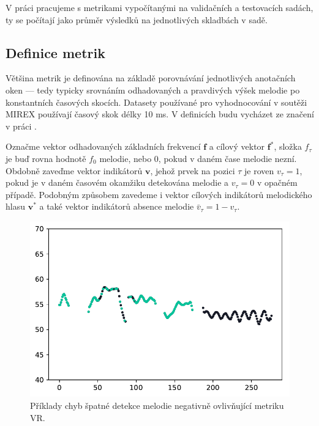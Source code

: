 V práci pracujeme s metrikami vypočítanými na validačních a testovacích sadách, ty se počítají jako průměr výsledků na jednotlivých skladbách v sadě.




\subsection{Definice metrik}

Většina metrik je definována na základě porovnávání jednotlivých anotačních oken --- tedy typicky srovnáním odhadovaných a pravdivých výšek melodie po konstantních časových skocích. Datasety používané pro vyhodnocování v soutěži MIREX používají časový skok délky 10 ms. V definicích budu vycházet ze značení v práci \cite{Salamon2014}. 

    Označme vektor odhadovaných základních frekvencí $\mathbf{f}$ a cílový vektor $\mathbf{f^*}$, složka $f_\tau$ je buď rovna hodnotě $f_0$ melodie, nebo $0$, pokud v daném čase melodie nezní. Obdobně zaveďme vektor indikátorů $\mathbf{v}$, jehož prvek na pozici $\tau$ je roven $v_\tau=1$, pokud je v daném časovém okamžiku detekována melodie a $v_\tau = 0$ v opačném případě. Podobným způsobem zavedeme i vektor cílových indikátorů melodického hlasu $\mathbf{v^*}$ a také vektor indikátorů absence melodie $\bar{v}_\tau = 1 - v_\tau$. 

\begin{figure}[h!]\centering
\includegraphics[scale=0.5]{../img/chyba_VR}
\caption{Příklady chyb špatné detekce melodie negativně ovlivňující metriku VR.}
\label{obr:chyba_VR}
\end{figure}

